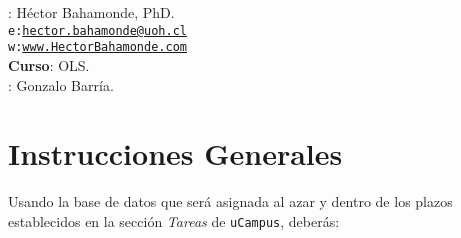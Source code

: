 \documentclass[10pt]{article}
\begin{document}


\thispagestyle{fancy} %





\hspace{-5mm}{\bf Profesor}: H\'ector Bahamonde, PhD.\\
\texttt{e:}\href{mailto:hector.bahamonde@uoh.cl}{\texttt{hector.bahamonde@uoh.cl}}\\
\texttt{w:}\href{http://www.hectorbahamonde.com}{\texttt{www.HectorBahamonde.com}}\\
{\bf Curso}: OLS.\\
\hspace{-5mm}{\bf TA}: Gonzalo Barr\'ia.


\vspace{-0.8cm}
\section*{Instrucciones Generales}

Usando la base de datos que ser\'a asignada al azar y dentro de los plazos establecidos en la secci\'on \emph{Tareas} de \texttt{uCampus}, deber\'as:
\end{document}
